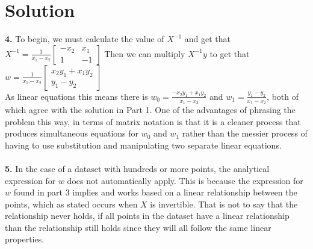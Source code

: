 \documentclass{harvardml}
\theoremstyle{definition}
\theoremstyle{plain}
\newenvironment{solution}
  {\color{blue}\section*{Solution}}
{}
\begin{document}
\begin{solution}
    \textbf{4.} To begin, we must calculate the value of $X^{-1}$ and get that $X^{-1} = \frac{1}{x_1 - x_2} \begin{bmatrix}
        -x_2 & x_1 \\ 1 & -1
    \end{bmatrix}$
    Then we can multiply $X^{-1}y$ to get that $w = \frac{1}{x_1 - x_2} \begin{bmatrix}
        x_2y_1 + x_1y_2 \\ y_1 - y_2
    \end{bmatrix}$ \\
    As linear equations this means there is $w_0 = \frac{-x_2y_1 + x_1y_2}{x_1 - x_2}$ and $w_1 = \frac{y_1 - y_2}{x_1 - x_2}$, 
    both of which agree with the solution in Part 1. One of the advantages of phrasing the problem this way, in terms of matrix notation is that 
    it is a cleaner process that produces simultaneous equations for $w_0$ and $w_1$ rather than the messier process of having to use substitution and manipulating 
    two separate linear equations. \\\\

    \textbf{5.} In the case of a dataset with hundreds or more points, the analytical expression for $w$ does not automatically apply. 
    This is because the expression for $w$ found in part 3 implies and works based on a linear relationship between the points, which as stated occurs when $X$ is invertible. 
    That is not to say that the relationship never holds, if all points in the dataset have a linear relationship than the relationship still holds since they will all follow the same linear properties. 
     
\end{solution}

\color{black}
\newpage
\end{document}
